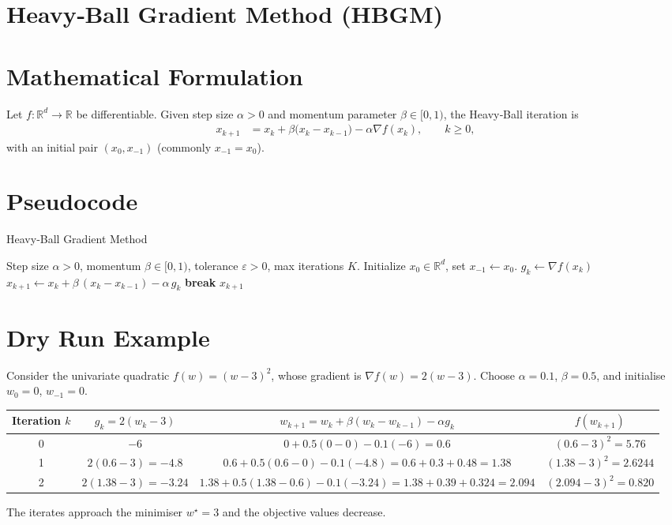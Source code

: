 \documentclass{article}
\newcommand{\norm}[1]{\left\lVert#1\right\rVert}
\begin{document}
\section*{Heavy‑Ball Gradient Method (HBGM)}

\section*{Mathematical Formulation}
Let $f:\mathbb{R}^{d}\rightarrow\mathbb{R}$ be differentiable.  
Given step size $\alpha>0$ and momentum parameter $\beta\in[0,1)$, the Heavy‑Ball iteration is
\begin{align}
    x_{k+1}&=x_{k}+\beta\bigl(x_{k}-x_{k-1}\bigr)-\alpha\nabla f(x_{k}),\qquad k\ge 0,
    \label{eq:update}
\end{align}
with an initial pair $(x_{0},x_{-1})$ (commonly $x_{-1}=x_{0}$).

\section*{Pseudocode}
\begin{algorithm}[H]
\caption{Heavy‑Ball Gradient Method}
\begin{algorithmic}[1]
\Require Step size $\alpha>0$, momentum $\beta\in[0,1)$, tolerance $\varepsilon>0$, max iterations $K$.
\State Initialize $x_{0}\in\mathbb{R}^{d}$, set $x_{-1}\gets x_{0}$.
    \State $g_{k}\gets\nabla f(x_{k})$
    \State $x_{k+1}\gets x_{k}+\beta\,(x_{k}-x_{k-1})-\alpha\,g_{k}$
    \If{$\norm{g_{k}}\le\varepsilon$}
        \State \textbf{break}
    \EndIf
\EndFor
\State \Return $x_{k+1}$
\end{algorithmic}
\end{algorithm}

\section*{Dry Run Example}
Consider the univariate quadratic $f(w)=(w-3)^{2}$, whose gradient is $\nabla f(w)=2(w-3)$.  
Choose $\alpha=0.1$, $\beta=0.5$, and initialise $w_{0}=0$, $w_{-1}=0$.

\begin{center}
\begin{tabular}{c|c|c|c}
Iteration $k$ & $g_{k}=2(w_{k}-3)$ & $w_{k+1}=w_{k}+\beta(w_{k}-w_{k-1})-\alpha g_{k}$ & $f(w_{k+1})$\\\hline
0 & $-6$ & $0+0.5(0-0)-0.1(-6)=0.6$ & $(0.6-3)^{2}=5.76$\\
1 & $2(0.6-3)=-4.8$ & $0.6+0.5(0.6-0)-0.1(-4.8)=0.6+0.3+0.48=1.38$ & $(1.38-3)^{2}=2.6244$\\
2 & $2(1.38-3)=-3.24$ & $1.38+0.5(1.38-0.6)-0.1(-3.24)=1.38+0.39+0.324=2.094$ & $(2.094-3)^{2}=0.820$\\
\end{tabular}
\end{center}
The iterates approach the minimiser $w^{\star}=3$ and the objective values decrease.
\end{document}
